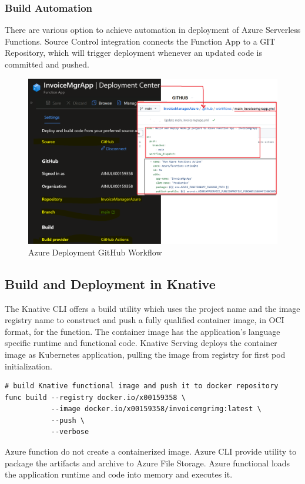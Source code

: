 \documentclass{article}
\begin{document}
\subsubsection{Build Automation}
\begin{flushleft}
There are various option to achieve automation in deployment of Azure Serverless Functions. Source Control integration connects the Function App to a GIT Repository, which will trigger deployment whenever an updated code is committed and pushed. 
\end{flushleft}
\begin{figure}[h]
    \centering
    \includegraphics[scale=0.20]{images/AzureDeploymentCenter.PNG}
    \caption{Azure Deployment GitHub Workflow}
\end{figure}

\subsection{Build and Deployment in Knative}
\begin{flushleft}
The Knative CLI offers a build utility which uses the project name and the image registry name to construct and push a fully qualified container image, in OCI format, for the function.  
The container image has the application's language specific runtime and functional code.
\hfill\break
Knative Serving deploys the container image as Kubernetes application, pulling the image from registry for first pod initialization.
\par
\begin{verbatim}
# build Knative functional image and push it to docker repository
func build --registry docker.io/x00159358 \
           --image docker.io/x00159358/invoicemgrimg:latest \
           --push \
           --verbose
\end{verbatim}

\par
Azure function do not create a containerized image. Azure CLI provide utility to package the artifacts and archive to Azure File Storage. Azure functional loads the application runtime and code into memory and executes it.

\end{flushleft}
\pagebreak
\end{document}
